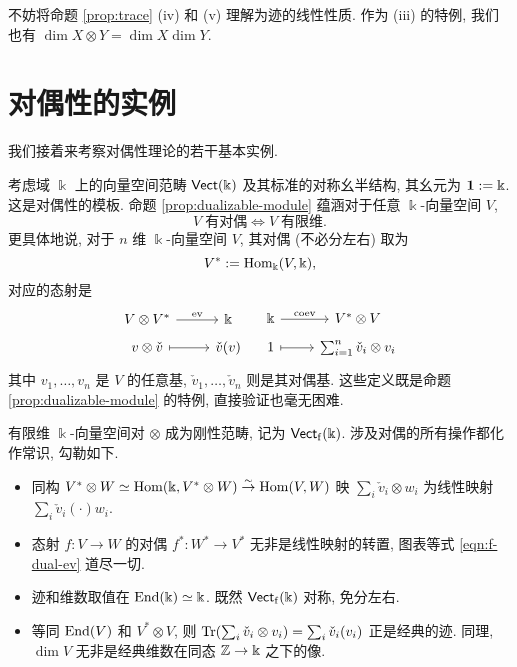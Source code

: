 不妨将命题 \ref{prop:trace} (iv) 和 (v) 理解为迹的线性性质. 作为 (iii) 的特例, 我们也有 $\dim X \otimes Y = \dim X \dim Y$.

\section{对偶性的实例}\label{sec:duality-examples}
我们接着来考察对偶性理论的若干基本实例.

\begin{example}\label{eg:Vect-trace}
	考虑域 $\Bbbk$ 上的向量空间范畴 $\mathsf{Vect}(\Bbbk)$ 及其标准的对称幺半结构, 其幺元为 $\bm{1} := \Bbbk$. 这是对偶性的模板. 命题 \ref{prop:dualizable-module} 蕴涵对于任意 $\Bbbk$-向量空间 $V$,
	\[ V \;\text{有对偶} \iff V \;\text{有限维}. \]
	更具体地说, 对于 $n$ 维 $\Bbbk$-向量空间 $V$, 其对偶 (不必分左右) 取为
	\[ V^* := \operatorname{Hom}_{\Bbbk}(V, \Bbbk), \]
	对应的态射是
	\[\begin{tikzcd}[row sep=tiny]
		V \otimes V^* \arrow[r, "{\mathrm{ev}}"] & \Bbbk \\
		v \otimes \check{v} \arrow[mapsto, r] & \check{v}(v)
	\end{tikzcd} \quad \begin{tikzcd}[row sep=tiny]
		\Bbbk \arrow[r, "{\mathrm{coev}}"] & V^* \otimes V \\
		1 \arrow[mapsto, r] & \sum_{i=1}^n \check{v}_i \otimes v_i
	\end{tikzcd} \]
	其中 $v_1, \ldots, v_n$ 是 $V$ 的任意基, $\check{v}_1, \ldots, \check{v}_n$ 则是其对偶基. 这些定义既是命题 \ref{prop:dualizable-module} 的特例, 直接验证也毫无困难.
	
	有限维 $\Bbbk$-向量空间对 $\otimes$ 成为刚性范畴, 记为 $\mathsf{Vect}_{\mathrm{f}}(\Bbbk)$. 涉及对偶的所有操作都化作常识, 勾勒如下.
	\begin{itemize}
		\item 同构 $V^* \otimes W \simeq \operatorname{Hom}(\Bbbk, V^* \otimes W) \stackrel{\sim}{\rightarrow} \operatorname{Hom}(V, W)$ 映 $\sum_i \check{v}_i \otimes w_i$ 为线性映射 $\sum_i \check{v}_i(\cdot) w_i$.
		\item 态射 $f: V \to W$ 的对偶 $f^*: W^* \to V^*$ 无非是线性映射的转置, 图表等式 \eqref{eqn:f-dual-ev}	道尽一切.
		\item 迹和维数取值在 $\operatorname{End}(\Bbbk) \simeq \Bbbk$. 既然 $\mathsf{Vect}_{\mathrm{f}}(\Bbbk)$ 对称, 免分左右.
		\item 等同 $\operatorname{End}(V)$ 和 $V^* \otimes V$, 则 $\operatorname{Tr}(\sum_i \check{v}_i \otimes v_i) = \sum_i \check{v}_i(v_i)$ 正是经典的迹. 同理, $\dim V$ 无非是经典维数在同态 $\mathbb{Z} \to \Bbbk$ 之下的像.
	\end{itemize}
\end{example}

